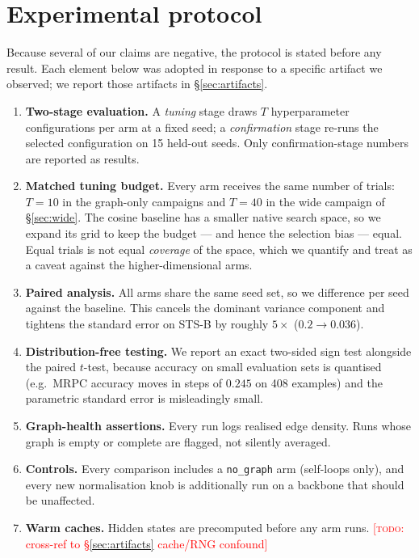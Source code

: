 \documentclass{article} %
\newcommand{\TODO}[1]{\textcolor{red}{[\textsc{todo}: #1]}}
\begin{document}
\section{Experimental protocol}
\label{sec:protocol}

Because several of our claims are negative, the protocol is stated before any
result. Each element below was adopted in response to a specific artifact we
observed; we report those artifacts in \S\ref{sec:artifacts}.

\begin{enumerate}
\item \textbf{Two-stage evaluation.} A \emph{tuning} stage draws $T$
      hyperparameter configurations per arm at a fixed seed; a
      \emph{confirmation} stage re-runs the selected configuration on 15
      held-out seeds. Only confirmation-stage numbers are reported as results.
\item \textbf{Matched tuning budget.} Every arm receives the same number of
      trials: $T = 10$ in the graph-only campaigns and $T = 40$ in the wide
      campaign of \S\ref{sec:wide}. The cosine baseline has a smaller native
      search space, so we expand its grid to keep the budget --- and hence the
      selection bias --- equal. Equal trials is not equal \emph{coverage} of
      the space, which we quantify and treat as a caveat against the
      higher-dimensional arms.
\item \textbf{Paired analysis.} All arms share the same seed set, so we
      difference per seed against the baseline. This cancels the dominant
      variance component and tightens the standard error on STS-B by
      roughly $5\times$ ($0.2 \rightarrow 0.036$).
\item \textbf{Distribution-free testing.} We report an exact two-sided sign
      test alongside the paired $t$-test, because accuracy on small
      evaluation sets is quantised (e.g.\ MRPC accuracy moves in steps of
      $0.245$ on 408 examples) and the parametric standard error is
      misleadingly small.
\item \textbf{Graph-health assertions.} Every run logs realised edge density.
      Runs whose graph is empty or complete are flagged, not silently averaged.
\item \textbf{Controls.} Every comparison includes a \texttt{no\_graph} arm
      (self-loops only), and every new normalisation knob is additionally run
      on a backbone that should be unaffected.
\item \textbf{Warm caches.} Hidden states are precomputed before any arm runs.
      \TODO{cross-ref to \S\ref{sec:artifacts} cache/RNG confound}
\end{enumerate}
\end{document}
